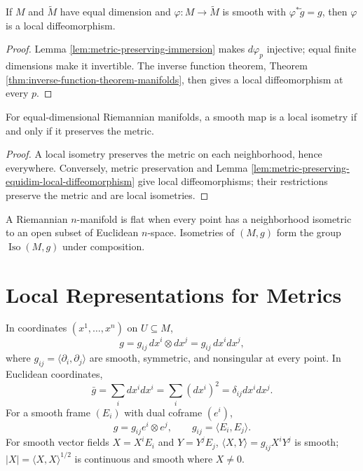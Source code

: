 \begin{lemma}
\label{lem:metric-preserving-equidim-local-diffeomorphism}
\leanok
{}
If $M$ and $\widetilde M$ have equal dimension and $\varphi:M\to\widetilde M$ is smooth with $\varphi^*\widetilde g=g$, then $\varphi$ is a local diffeomorphism.
\end{lemma}
\begin{proof}
\leanok
{}
\sketch Lemma \ref{lem:metric-preserving-immersion} makes $d\varphi_p$ injective; equal finite dimensions make it invertible. The inverse function theorem, Theorem \ref{thm:inverse-function-theorem-manifolds}, then gives a local diffeomorphism at every $p$.
\end{proof}

\begin{proposition}
\label{prop:characterize-local-isometry}
\leanok
{}
For equal-dimensional Riemannian manifolds, a smooth map is a local isometry
if and only if it preserves the metric.
\end{proposition}
\begin{proof}
\leanok
{}
\sketch A local isometry preserves the metric on each neighborhood, hence everywhere. Conversely, metric preservation and Lemma \ref{lem:metric-preserving-equidim-local-diffeomorphism} give local diffeomorphisms; their restrictions preserve the metric and are local isometries.
\end{proof}

A Riemannian $n$-manifold is flat when every point has a neighborhood isometric to an open subset of Euclidean $n$-space. Isometries of $(M,g)$ form the group $\operatorname{Iso}(M,g)$ under composition.

\section{Local Representations for Metrics}

In coordinates $(x^1,\ldots,x^n)$ on $U\subseteq M$,
\[
g=g_{ij}\,dx^i\otimes dx^j=g_{ij}\,dx^i dx^j,\tag{2.7}
\]
where $g_{ij}=\langle\partial_i,\partial_j\rangle$ are smooth, symmetric, and nonsingular at every point. In Euclidean coordinates,
\[
\bar g=\sum_i dx^i dx^i=\sum_i(dx^i)^2=\delta_{ij}dx^i dx^j.\tag{2.8}
\]
For a smooth frame $(E_i)$ with dual coframe $(e^i)$,
\[
g=g_{ij}e^i\otimes e^j,\qquad g_{ij}=\langle E_i,E_j\rangle.\tag{2.9}
\]
For smooth vector fields $X=X^iE_i$ and $Y=Y^jE_j$, $\langle X,Y\rangle=g_{ij}X^iY^j$ is smooth; $|X|=\langle X,X\rangle^{1/2}$ is continuous and smooth where $X\ne0$.

